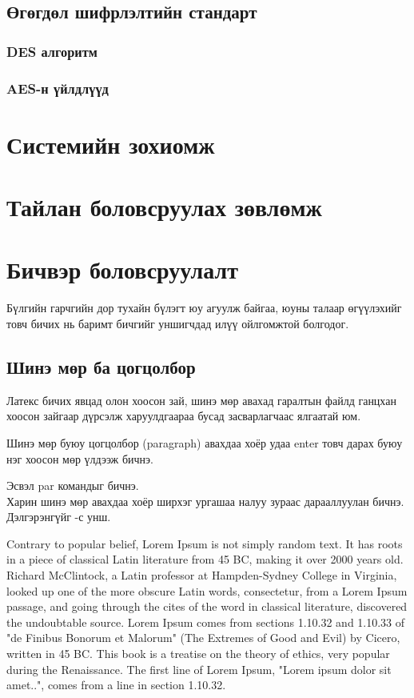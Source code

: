\documentclass[12pt,A4]{report}
\begin{document}
\section{Өгөгдөл шифрлэлтийн стандарт}
\subsection{DES алгоритм}
\subsection{AES-н үйлдлүүд}
\chapter{Системийн зохиомж}

\chapter{Тайлан боловсруулах зөвлөмж}


\chapter{Бичвэр боловсруулалт}
Бүлгийн гарчгийн дор тухайн бүлэгт юу агуулж байгаа, юуны талаар өгүүлэхийг товч бичих нь баримт бичгийг уншигчдад илүү ойлгомжтой болгодог.
\section{Шинэ мөр ба цогцолбор}
Латекс бичих явцад олон хоосон зай, шинэ мөр авахад гаралтын файлд ганцхан хоосон зайгаар дүрсэлж харуулдгаараа бусад засварлагчаас ялгаатай юм.

Шинэ мөр буюу цогцолбор (paragraph) авахдаа хоёр удаа enter товч дарах буюу нэг хоосон мөр үлдээж бичнэ. \par Эсвэл par командыг бичнэ.
\\Харин шинэ мөр авахдаа хоёр ширхэг ургашаа налуу зураас дарааллуулан бичнэ.  Дэлгэрэнгүйг \cite{pharagraph1}-с унш.

Contrary to popular belief, Lorem Ipsum is not simply random text. It has roots in a piece of classical Latin literature from 45 BC, making it over 2000 years old. Richard McClintock, a Latin professor at Hampden-Sydney College in Virginia, looked up one of the more obscure Latin words, consectetur, from a Lorem Ipsum passage, and going through the cites of the word in classical literature, discovered the undoubtable source. Lorem Ipsum comes from sections 1.10.32 and 1.10.33 of "de Finibus Bonorum et Malorum" (The Extremes of Good and Evil) by Cicero, written in 45 BC. This book is a treatise on the theory of ethics, very popular during the Renaissance. The first line of Lorem Ipsum, "Lorem ipsum dolor sit amet..", comes from a line in section 1.10.32.
\end{document}
